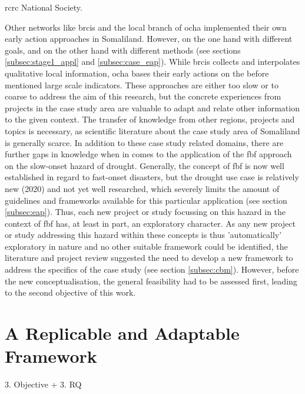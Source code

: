 \acrshort{rcrc} National Society.\newline

Other networks like \acrlong{brcis} and the local branch of \acrshort{ocha} implemented their own early action approaches in Somaliland. However, on the one hand with different goals, and on the other hand with different methods (see sections \ref{subsec:stage1_appl} and \ref{subsec:case_eap}). While \acrshort{brcis} collects and interpolates qualitative local information, \acrshort{ocha} bases their early actions on the before mentioned large scale indicators. These approaches are either too slow or to coarse to address the aim of this research, but the concrete experiences from projects in the case study area are valuable to adapt and relate other information to the given context. The transfer of knowledge from other regions, projects and topics is necessary, as scientific literature about the case study area of Somaliland is generally scarce. In addition to these case study related domains, there are further gaps in knowledge when in comes to the application of the \acrshort{fbf} approach on the slow-onset hazard of drought. Generally, the concept of \acrshort{fbf} is now well established in regard to fast-onset disasters, but the drought use case is relatively new (2020) and not yet well researched, which severely limits the amount of guidelines and frameworks available for this particular application (see section \ref{subsec:eap}). Thus, each new project or study focussing on this hazard in the context of \acrshort{fbf} has, at least in part, an exploratory character.\newline
As any new project or study addressing this hazard within these concepts is thus 'automatically' exploratory in nature and no other suitable framework could be identified, the literature and project review suggested the need to develop a new framework to address the specifics of the case study (see section \ref{subsec:cbm}). However, before the new conceptualisation, the general feasibility had to be assessed first, leading to the second objective of this work.


\section{A Replicable and Adaptable Framework}
3. Objective + 3. RQ





